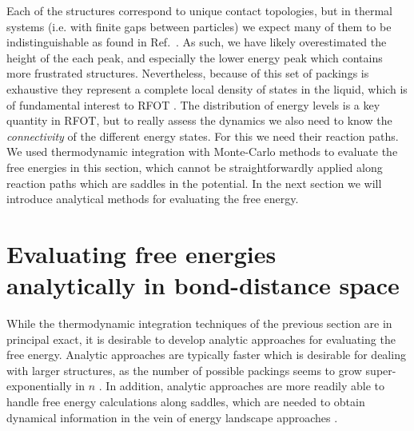 \documentclass[11pt,twoside]{report}
\begin{document}
Each of the structures correspond to unique contact topologies, but in thermal systems (i.e. with finite gaps between particles) we expect many of them to be indistinguishable as found in Ref.\ \cite{TrombachPRE2018}.
As such, we have likely overestimated the height of the each peak, and especially the lower energy peak which contains more frustrated structures.
Nevertheless, because of this set of packings is exhaustive they represent a complete local density of states in the liquid, which is of fundamental interest to RFOT \cite{LubchenkoARPC2007}.
The distribution of energy levels is a key quantity in RFOT, but to really assess the dynamics we also need to know the \emph{connectivity} of the different energy states.
For this we need their reaction paths.
We used thermodynamic integration with Monte-Carlo methods to evaluate the free energies in this section, which cannot be straightforwardly applied along reaction paths which are saddles in the potential.
In the next section we will introduce analytical methods for evaluating the free energy.


\section{Evaluating free energies analytically in bond-distance space}
\label{sec:bond-distance}

While the thermodynamic integration techniques of the previous section are in principal exact, it is desirable to develop analytic approaches for evaluating the free energy.
Analytic approaches are typically faster which is desirable for dealing with larger structures, as the number of possible packings seems to grow super-exponentially in $n$ \cite{Holmes-CerfonSR2016}.
In addition, analytic approaches are more readily able to handle free energy calculations along saddles, which are needed to obtain dynamical information in the vein of energy landscape approaches \cite{Wales2004}.
\end{document}
